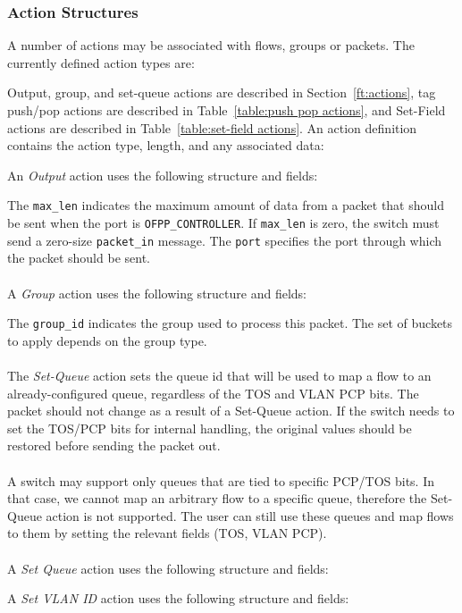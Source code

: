 \subsubsection{Action Structures}
\label{sec:action structures}
A number of actions may be associated with flows, groups or packets.  The currently defined action types are:

 
Output, group, and set-queue actions are described in Section~\ref{ft:actions}, tag push/pop actions are described in Table~\ref{table:push pop actions}, and Set-Field actions are described in Table~\ref{table:set-field actions}.  An action definition contains the action type, length, and any associated data:


An \emph{Output} action uses the following structure and fields:


The \verb|max_len| indicates the maximum amount of data from a packet that should be sent when the port is \verb|OFPP_CONTROLLER|.  If \verb|max_len| is zero, the switch must send a zero-size \verb|packet_in| message.  The \verb|port| specifies the port through which the packet should be sent.
\\\\
A \emph{Group} action uses the following structure and fields:


The \verb|group_id| indicates the group used to process this packet.  The set of buckets to apply depends on the group type.
\\\\
The \emph{Set-Queue} action sets the queue id that will be used to map a flow to an already-configured queue, regardless of the TOS and VLAN PCP bits. The packet should not change as a result of a Set-Queue action. If the switch needs to set the TOS/PCP bits for internal handling, the original values should be restored before sending the packet out.
\\\\
A switch may support only queues that are tied to specific PCP/TOS bits. In that case, we cannot map an arbitrary flow to a specific queue, therefore the Set-Queue action is not supported. The user can still use these queues and map flows to them by setting the relevant fields (TOS, VLAN PCP).
\\\\
A \emph{Set Queue} action uses the following structure and fields:


A \emph{Set VLAN ID} action uses the following structure and fields:

